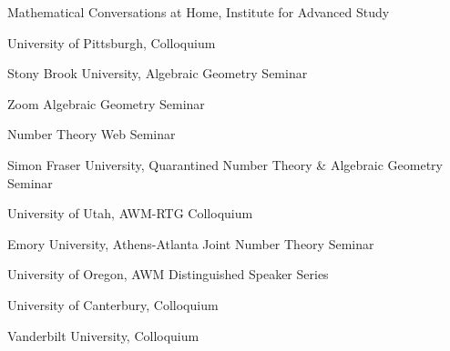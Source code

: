 \documentclass[12pt]{article}
\newenvironment{date_section}
	{
	\vspace{-1ex}
	\leftmargini = 15ex
	 \begin{itemize}[
		 labelsep = *,
		 labelwidth = 9ex,
		 labelindent = 0ex,
		 itemindent = !,
		 font=\normalfont, 
		 align=parleft
		 ]
		{}
		\itemsep=-1.5mm}
	{\end{itemize}\vspace{-2ex}}
\newcommand{\yearmo}[2]{
	\item[ 
		{\makebox[1ex][r]{#1}}
		\hspace{1ex}
		{\makebox[1ex][l]{#2} }
		] }
\begin{document}
\begin{date_section}
            \yearmo{}{2020}
                Mathematical Conversations at Home, Institute for Advanced Study

            \yearmo{}{} 
                University of Pittsburgh, Colloquium


            \yearmo{}{} 
                Stony Brook University, Algebraic Geometry Seminar


            \yearmo{}{} 
                Zoom Algebraic Geometry Seminar

			\yearmo{}{}
				Number Theory Web Seminar

			\yearmo{}{}
				Simon Fraser University, Quarantined Number Theory \& Algebraic Geometry Seminar



			\yearmo{}{}
				University of Utah, AWM-RTG Colloquium

				

            \yearmo{}{2018}
                Emory University,
                Athens-Atlanta Joint Number Theory Seminar

            \yearmo{}{2017}
                University of Oregon,
                AWM Distinguished Speaker Series


            \yearmo{}{}
				University of Canterbury,
				Colloquium
				

			\yearmo{}{}
				Vanderbilt University,
				Colloquium

			
			
				

\end{date_section}
\end{document}
